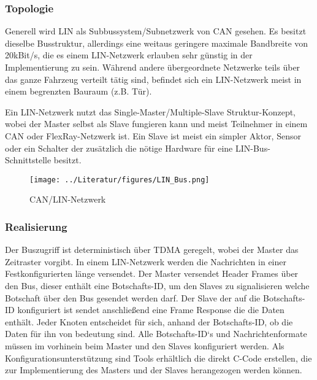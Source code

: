     \subsubsection{Topologie}
    Generell wird LIN als Subbussystem/Subnetzwerk von CAN gesehen. Es besitzt dieselbe
    Busstruktur, allerdings eine weitaus geringere maximale Bandbreite von 20kBit/s, 
    die es einem LIN-Netzwerk erlauben sehr günstig in der Implementierung zu sein.
    Während andere übergeordnete Netzwerke teils über das ganze Fahrzeug verteilt tätig sind,
    befindet sich ein LIN-Netzwerk meist in einem begrenzten Bauraum (z.B. Tür). 
    ~\cite{LA_Bosch_6te_auflage}

    Ein LIN-Netzwerk nutzt das Single-Master/Multiple-Slave Struktur-Konzept, wobei der Master
    selbst als Slave fungieren kann und meist Teilnehmer in einem CAN oder FlexRay-Netzwerk ist.
    Ein Slave ist meist ein simpler Aktor, Sensor oder ein Schalter der zusätzlich die nötige Hardware 
    für eine LIN-Bus-Schnittstelle besitzt.
    ~\cite{LA_Bosch_6te_auflage}
    ~\cite{LA_LIN1}
    
    \begin{figure}
        \texttt{[image: ../Literatur/figures/LIN\_Bus.png]}
        \caption[
            https://external.dandelon.com/download/attachments/dandelon/ids/DE00247D282900209D5B0C1257814004D24BA.pdf
            ]
            {CAN/LIN-Netzwerk}
    \end{figure}

    \subsubsection{Realisierung}

    Der Buszugriff ist deterministisch über TDMA geregelt, wobei der Master das Zeitraster vorgibt.
    In einem LIN-Netzwerk werden die Nachrichten in einer Festkonfigurierten länge versendet.
    Der Master versendet Header Frames über den Bus, dieser enthält eine Botschafts-ID, um 
    den Slaves zu signalisieren welche Botschaft über den Bus gesendet werden darf. Der Slave
    der auf die Botschafts-ID konfiguriert ist sendet anschließend eine Frame Response die die 
    Daten enthält. Jeder Knoten entscheidet für sich, anhand der Botschafts-ID, ob die Daten für 
    ihn von bedeutung sind.
    Alle Botschafts-ID‘s und Nachrichtenformate müssen im vorhinein beim
    Master und den Slaves konfiguriert werden. Als Konfigurationsunterstützung sind Tools 
    erhältlich die direkt C-Code erstellen, die zur Implementierung des Masters und der Slaves
    herangezogen werden können.~\cite{LA_LIN1}\cite{LA_LDF-Tool}

